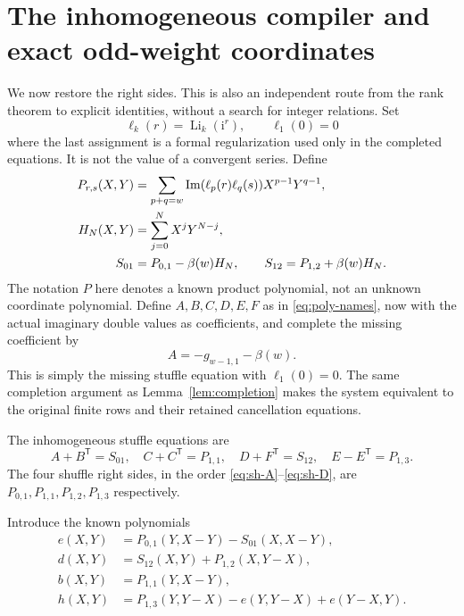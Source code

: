 \documentclass[11pt,a4paper]{article}
\numberwithin{equation}{section}
\theoremstyle{definition}\newtheorem{definition}[theorem]{Definition}
\theoremstyle{remark}\newtheorem{remark}[theorem]{Remark}
\newcommand{\ii}{\mathrm i}
\newcommand{\Li}{\operatorname{Li}}
\newcommand{\Imag}{\operatorname{Im}}
\newcommand{\rev}{\mathsf T}
\begin{document}
\section{The inhomogeneous compiler and exact odd-weight coordinates}
\label{sec:affine}
We now restore the right sides. This is also an independent route from the
rank theorem to explicit identities, without a search for integer relations.
Set
\[
\ell_k(r)=\Li_k(\ii^r),\qquad \ell_1(0)=0
\]
where the last assignment is a formal regularization used only in the
completed equations. It is not the value of a convergent series. Define
\begin{align}
P_{r,s}(X,Y)&=\sum_{p+q=w}\Imag(\ell_p(r)\ell_q(s))X^{p-1}Y^{q-1},
\label{eq:P-def}\\
H_N(X,Y)&=\sum_{j=0}^{N}X^jY^{N-j},\notag\\
S_{01}&=P_{0,1}-\beta(w)H_N,\qquad
S_{12}=P_{1,2}+\beta(w)H_N.\label{eq:S-def}
\end{align}
The notation $P$ here denotes a known product polynomial, not an unknown
coordinate polynomial. Define $A,B,C,D,E,F$ as in
\eqref{eq:poly-names}, now with the actual imaginary double values as
coefficients, and complete the missing coefficient by
\begin{equation}
[X^0Y^N]A=-g_{w-1,1}-\beta(w).
\label{eq:affine-completion}
\end{equation}
This is simply the missing stuffle equation with $\ell_1(0)=0$. The same
completion argument as Lemma~\ref{lem:completion} makes the system equivalent
to the original finite rows and their retained cancellation equations.

The inhomogeneous stuffle equations are
\begin{equation}
A+B^\rev=S_{01},\quad C+C^\rev=P_{1,1},\quad
D+F^\rev=S_{12},\quad E-E^\rev=P_{1,3}.
\label{eq:affine-st}
\end{equation}
The four shuffle right sides, in the order
\eqref{eq:sh-A}--\eqref{eq:sh-D}, are
$P_{0,1},P_{1,1},P_{1,2},P_{1,3}$ respectively.

Introduce the known polynomials
\begin{align}
e(X,Y)&=P_{0,1}(Y,X-Y)-S_{01}(X,X-Y),\label{eq:e}\\
d(X,Y)&=S_{12}(X,Y)+P_{1,2}(X,Y-X),\label{eq:d}\\
b(X,Y)&=P_{1,1}(Y,X-Y),\label{eq:b}\\
h(X,Y)&=P_{1,3}(Y,Y-X)-e(Y,Y-X)+e(Y-X,Y).
\label{eq:h}
\end{align}
\end{document}
